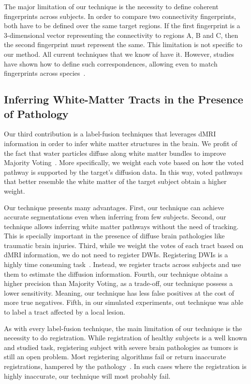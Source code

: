 The major limitation of our technique is the necessity to define coherent
fingerprints across subjects. In order to compare two connectivity fingerprints,
both have to be defined over the same target regions. If the first fingerprint
is a 3-dimensional vector representing the connectivity to regions A, B and C,
then the second fingerprint must represent the same. This limitation is not
specific to our method. All current techniques that we know of have it. However,
studies have shown how to define such correspondences, allowing even to match
fingerprints across species~\cite{Mars2016, Mars2018}.

\subsection{Inferring White-Matter Tracts in the Presence of Pathology}
Our third contribution is a label-fusion techniques that leverages dMRI information
in order to infer white matter structures in the brain. We profit of the fact
that water particles diffuse along white matter bundles to improve Majority
Voting~\cite{Xu1992}. More specifically, we weight each vote based on how the voted pathway
is supported by the target's diffusion data. In this way, voted
pathways that better resemble the white matter of the target subject obtain a 
higher weight.

Our technique presents many advantages. First, our technique can achieve accurate
segmentations even when inferring from few subjects. Second, our technique
allows inferring white matter pathways without the need of tracking. This is
specially important in the presence of diffuse brain pathologies like traumatic
brain injuries. Third, while we weight the
votes of each tract based on dMRI information, we do not need to register
DWIs. Registering DWIs is a highly time consuming task~\cite{ODonnell2017}.
Instead, we register tracts across subjects and use them to estimate the diffusion
information. Fourth, our technique obtains a higher precision than Majority
Voting, as a trade-off, our technique possess a lower sensitivity. Meaning,
our technique has less false positives at the cost of more true negatives.
Fifth, in our simulated experiments, out technique was able to label a tract
affected by a local lesion.


As with every label-fusion technique, the main limitation of our technique
is the necessity to do registration. While registration of healthy subjects
is a well known and studied task, registering subject with severe brain pathologies
as tumors is still an open problem. Most registering algorithms fail or return inaccurate
registrations, hampered by the pathology~\cite{Lutkenhoff2014}. In such cases
where the registration is highly inaccurate, our technique will most probably fail.

